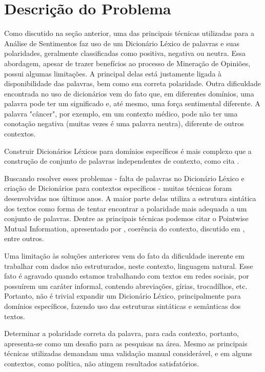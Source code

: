 \documentclass[a4paper,11pt]{article}
\begin{document}
\section{Descrição do Problema}
\label{sec:desc}
Como discutido na seção anterior, uma das principais técnicas utilizadas para a Análise de Sentimentos faz uso de um Dicionário Léxico de palavras e suas polaridades, geralmente classificadas como positiva, negativa ou neutra. Essa abordagem, apesar de trazer benefícios ao processo de Mineração de Opiniões, possui algumas limitações. A principal delas está justamente ligada à disponibilidade das palavras, bem como sua correta polaridade. Outra dificuldade encontrada no uso de dicionários vem do fato que, em diferentes domínios, uma palavra pode ter um significado e, até mesmo, uma força sentimental diferente. A palavra "câncer", por exemplo, em um contexto médico, pode não ter uma conotação negativa (muitas vezes é uma palavra neutra), diferente de outros contextos.

Construir Dicionários Léxicos para domínios específicos é mais complexo que a construção de conjunto de palavras independentes de contexto, como cita \cite{Kanayama2006}.

Buscando resolver esses problemas - falta de palavras no Dicionário Léxico e criação de Dicionários para contextos específicos - muitas técnicas foram desenvolvidas nos últimos anos. A maior parte delas utiliza a estrutura sintática dos textos como forma de tentar encontrar a polaridade mais adequada a um conjunto de palavras. Dentre as principais técnicas podemos citar o Pointwise Mutual Information, apresentado por \cite{Turney2002}, coerência do contexto, discutido em \cite{Kanayama2006}, entre outros.

Uma limitação às soluções anteriores vem do fato da dificuldade inerente em trabalhar com dados não estruturados, neste contexto, linguagem natural. Esse fato é agravado quando estamos trabalhando com textos em redes sociais, por possuírem um caráter informal, contendo abreviações, gírias, trocadílhos, etc. Portanto, não é trivial expandir um Dicionário Léxico, principalmente para domínios específicos, fazendo uso das estruturas sintáticas e semânticas dos textos.

Determinar a polaridade correta da palavra, para cada contexto, portanto, apresenta-se como um desafio para as pesquisas na área. Mesmo as principais técnicas utilizadas demandam uma validação manual considerável, e em alguns contextos, como política, não atingem resultados satisfatórios.
\end{document}
